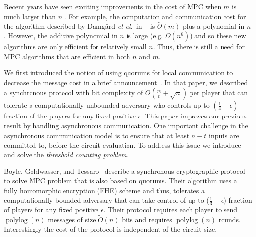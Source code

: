 \documentclass[10pt]{llncs}
\newcommand{\etal}{\emph{et al.\,}}
\DeclareMathOperator{\polylog}{polylog}
\begin{document}
Recent years have seen exciting improvements in the cost of MPC when
$m$ is much larger than $n$
\cite{damgard2006scalable,damgard2007scalable,damgard2008scalable}. 
For example, the computation and communication cost for the algorithm described by Damg{\aa}rd \etal
in
~\cite{damgard2008scalable} is $\tilde{O}(m)$ plus a polynomial in
$n$. However, the additive polynomial in $n$ is large
(e.g. $\Omega(n^{6})$) and so these new algorithms are only efficient
for relatively small $n$. Thus, there is still a need for MPC
algorithms that are efficient in both $n$ and $m$.

We first introduced the notion of using quorums for local
communication to decrease the message cost in a brief
announcement~\cite{Dani12}. In that paper, we described a synchronous
protocol with bit complexity of $\tilde{O}(\frac{m}{n} + \sqrt{n})$
per player that can tolerate a computationally unbounded adversary who
controls up to $(\frac14 - \epsilon)$ fraction of the players for any
fixed positive $\epsilon$. This paper improves our previous result by
handling asynchronous communication. One important challenge in 
the asynchronous communication model is to ensure that at least 
$n-t$ inputs are committed to, before the circuit evaluation. 
To address this issue we introduce and solve the \emph{threshold counting 
problem.}

Boyle, Goldwasser, and Tessaro~\cite{Boyle13} describe a synchronous
cryptographic protocol to solve MPC problem that is also based on
quorums. Their algorithm uses a fully homomorphic encryption (FHE)
scheme and thus, tolerates a computationally-bounded adversary that
can take control of up to ($\frac13 - \epsilon$) fraction of players for
any fixed positive $\epsilon$. Their protocol requires each player to
send $\polylog(n)$ messages of size $\tilde{O}(n)$ bits and
requires $\polylog(n)$ rounds. Interestingly
the cost of the protocol is independent of the circuit size.
\end{document}

